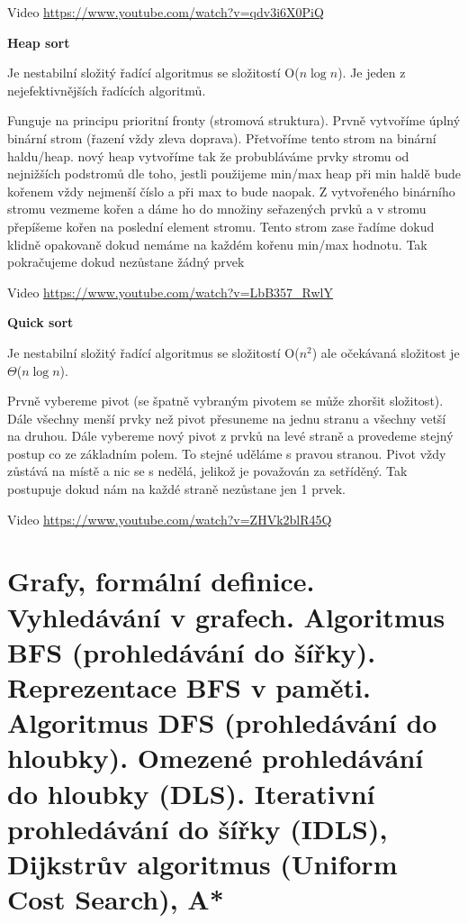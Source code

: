 Video \url{https://www.youtube.com/watch?v=qdv3i6X0PiQ}

\begin{Large}\vspace{0,5cm} \textbf{Heap sort}
\end{Large}

Je nestabilní složitý řadící algoritmus se složitostí O($n\log{n}$). Je jeden z nejefektivnějších řadících algoritmů.

Funguje na principu prioritní fronty (stromová struktura). Prvně vytvoříme úplný binární strom (řazení vždy zleva doprava). Přetvoříme tento strom na binární haldu/heap. nový heap vytvoříme tak že probubláváme prvky stromu od nejnižších podstromů dle toho, jestli použijeme min/max heap při min haldě bude kořenem vždy nejmenší číslo a při max to bude naopak. Z vytvořeného binárního stromu vezmeme kořen a dáme ho do množiny seřazených prvků a v stromu přepíšeme kořen na poslední element stromu. Tento strom zase řadíme dokud klidně opakovaně dokud nemáme na každém kořenu min/max hodnotu. Tak pokračujeme dokud nezůstane žádný prvek

Video \url{https://www.youtube.com/watch?v=LbB357_RwlY}

\begin{Large}\vspace{0,5cm} \textbf{Quick sort}
\end{Large}

Je nestabilní složitý řadící algoritmus se složitostí O($n^2$) ale očekávaná složitost je $\Theta$($n\log{n}$).

Prvně vybereme pivot (se špatně vybraným pivotem se může zhoršit složitost). Dále všechny menší prvky než pivot přesuneme na jednu stranu a všechny vetší na druhou. Dále vybereme nový pivot z prvků na levé straně a provedeme stejný postup co ze základním polem. To stejné uděláme s pravou stranou. Pivot vždy zůstává na místě a nic se s nedělá, jelikož je považován za setříděný. Tak postupuje dokud nám na každé straně nezůstane jen 1 prvek.

Video \url{https://www.youtube.com/watch?v=ZHVk2blR45Q}










\newpage
\section{Grafy, formální definice. Vyhledávání v grafech. Algoritmus BFS (prohledávání do šířky). Reprezentace BFS v paměti. Algoritmus DFS (prohledávání do hloubky). Omezené prohledávání do hloubky (DLS). Iterativní prohledávání do šířky (IDLS), Dijkstrův algoritmus (Uniform Cost Search), A*}

